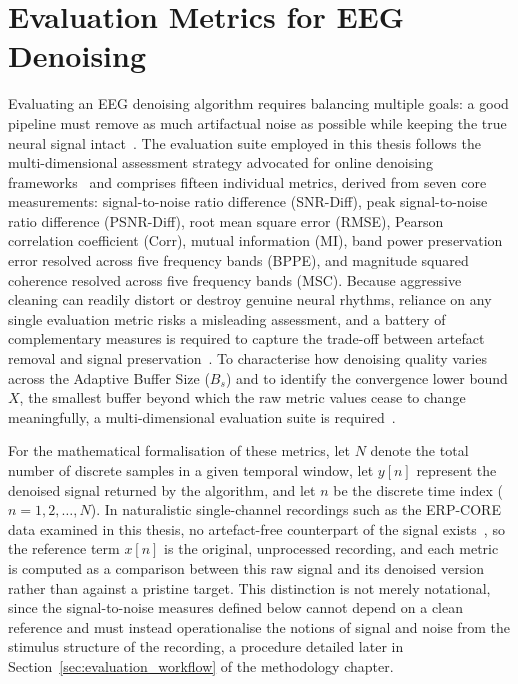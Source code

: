 \documentclass[MScCS,12pt,oneside,final]{uccthesis}
\begin{document}
\section{Evaluation Metrics for EEG Denoising}
\label{sec:metrics}
    
    Evaluating an EEG denoising algorithm requires balancing multiple goals: a good pipeline must remove as much artifactual noise as possible while keeping the true neural signal intact~\parencite{chen2014eeg, sweeney2012artifact}. The evaluation suite employed in this thesis follows the multi-dimensional assessment strategy advocated for online denoising frameworks~\parencite{longo2026framework} and comprises fifteen individual metrics, derived from seven core measurements: signal-to-noise ratio difference (SNR-Diff), peak signal-to-noise ratio difference (PSNR-Diff), root mean square error (RMSE), Pearson correlation coefficient (Corr), mutual information (MI), band power preservation error resolved across five frequency bands (BPPE), and magnitude squared coherence resolved across five frequency bands (MSC). Because aggressive cleaning can readily distort or destroy genuine neural rhythms, reliance on any single evaluation metric risks a misleading assessment, and a battery of complementary measures is required to capture the trade-off between artefact removal and signal preservation~\parencite{sweeney2012artifact}. To characterise how denoising quality varies across the Adaptive Buffer Size ($B_s$) and to identify the convergence lower bound $X$, the smallest buffer beyond which the raw metric values cease to change meaningfully, a multi-dimensional evaluation suite is required~\parencite{longo2025oneegwavelad}.
    
    For the mathematical formalisation of these metrics, let $N$ denote the total number of discrete samples in a given temporal window, let $y[n]$ represent the denoised signal returned by the algorithm, and let $n$ be the discrete time index ($n = 1, 2, \ldots, N$). In naturalistic single-channel recordings such as the ERP-CORE data examined in this thesis, no artefact-free counterpart of the signal exists~\parencite{longo2025oneegwavelad, kappenman2021erp}, so the reference term $x[n]$ is the original, unprocessed recording, and each metric is computed as a comparison between this raw signal and its denoised version rather than against a pristine target. This distinction is not merely notational, since the signal-to-noise measures defined below cannot depend on a clean reference and must instead operationalise the notions of signal and noise from the stimulus structure of the recording, a procedure detailed later in Section~\ref{sec:evaluation_workflow} of the methodology chapter.
\end{document}
